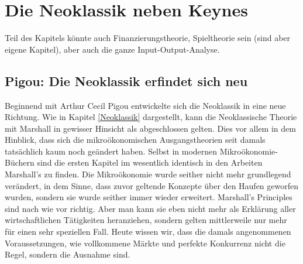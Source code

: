 %
%
%

\chapter{Die Neoklassik neben Keynes}
\label{Neoklassik_nach1945}

Teil des Kapitels könnte auch Finanzierungstheorie, Spieltheorie sein (sind aber eigene Kapitel), aber auch die ganze Input-Output-Analyse.


\section{Pigou: Die Neoklassik erfindet sich neu}
\label{sec: Pigou}

Beginnend mit Arthur Cecil Pigou entwickelte sich die Neoklassik in eine neue Richtung. Wie in Kapitel \ref{Neoklassik} dargestellt, kann die Neoklassische Theorie mit Marshall in gewisser Hinsicht als abgeschlossen gelten. Dies vor allem in dem Hinblick, dass sich die mikroökonomischen Ausgangstheorien seit damals tatsächlich kaum noch geändert haben. Selbst in modernen Mikroökonomie-Büchern sind die ersten Kapitel im wesentlich identisch in den Arbeiten Marshall's zu finden. Die Mikroökonomie wurde seither nicht mehr grundlegend verändert, in dem Sinne, dass zuvor geltende Konzepte über den Haufen geworfen wurden, sondern sie wurde seither immer wieder erweitert. Marshall's Principles sind nach wie vor richtig. Aber man kann sie eben nicht mehr als Erklärung aller wirtschaftlichen Tätigkeiten heranziehen, sondern gelten mittlerweile nur mehr für einen sehr speziellen Fall. Heute wissen wir, dass die damals angenommenen Voraussetzungen, wie vollkommene Märkte und perfekte Konkurrenz nicht die Regel, sondern die Ausnahme sind.

